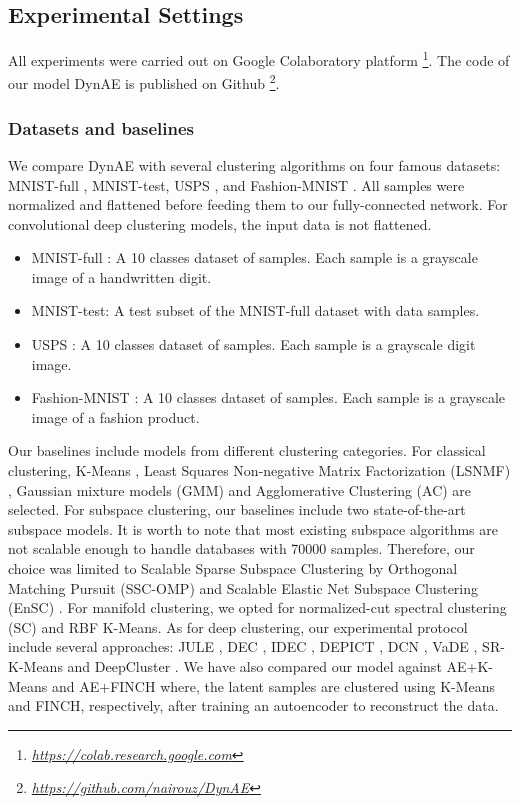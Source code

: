 \documentclass{article}
\begin{document}
\subsection{Experimental Settings} 
All experiments were carried out on Google Colaboratory platform \footnote{\textit{\url{https://colab.research.google.com}}}. The code of our model DynAE is published on Github \footnote{ \textit{\href{https://github.com/nairouz/DynAE}{https://github.com/nairouz/DynAE}}}.

\subsubsection{Datasets and baselines}


We compare DynAE with several clustering algorithms on four famous datasets: MNIST-full \cite{paper38}, MNIST-test, USPS \cite{paper39}, and Fashion-MNIST \cite{paper40}. All samples were normalized and flattened before feeding them to our fully-connected network. For convolutional deep clustering models, the input data is not flattened.

\begin{itemize}
    \item MNIST-full \cite{paper38}: A 10 classes dataset of  samples. Each sample is a  grayscale image of a handwritten digit. 
    \item MNIST-test: A test subset of the MNIST-full dataset with  data samples.  
    \item USPS \cite{paper39}: A 10 classes dataset of  samples. Each sample is a  grayscale digit image. 
    \item Fashion-MNIST \cite{paper40}: A 10 classes dataset of  samples. Each sample is a  grayscale image of a fashion product.
\end{itemize}

Our baselines include models from different clustering categories. For classical clustering,  
K-Means \cite{paper14}, Least Squares Non-negative Matrix Factorization (LSNMF) \cite{paper75}, Gaussian mixture models (GMM) \cite{paper47} and Agglomerative Clustering (AC) \cite{paper74} are selected. For subspace clustering, our baselines include two state-of-the-art subspace models. It is worth to note that most existing subspace algorithms are not scalable enough to handle databases with 70000 samples. Therefore, our choice was limited to Scalable Sparse Subspace Clustering by Orthogonal Matching Pursuit (SSC-OMP) \cite{paper78} and Scalable Elastic Net Subspace Clustering (EnSC) \cite{paper79}. For manifold clustering, we opted for normalized-cut spectral clustering (SC) \cite{paper76} and RBF K-Means\cite{paper77}.
As for deep clustering, our experimental protocol include several approaches: JULE \cite{paper22}, DEC \cite{paper27}, IDEC \cite{paper28}, DEPICT \cite{paper36}, DCN \cite{paper29}, VaDE \cite{paper35}, SR-K-Means\cite{paper73} and DeepCluster \cite{paper24}. We have also compared our model against AE+K-Means and AE+FINCH where, the latent samples are clustered using K-Means and FINCH, respectively, after training an autoencoder to reconstruct the data.
\end{document}
